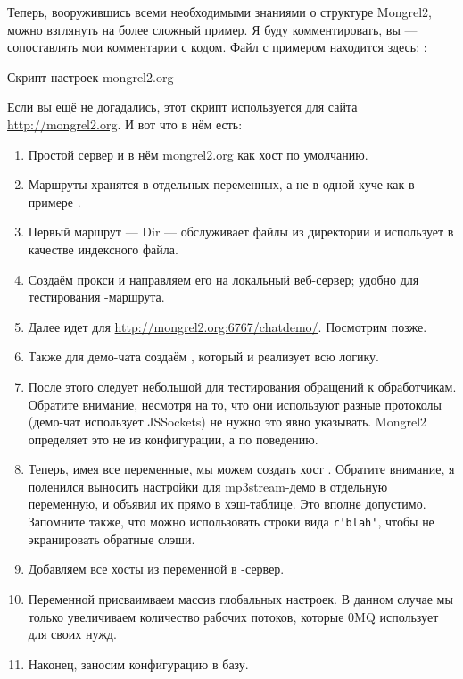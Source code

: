Теперь, вооружившись всеми необходимыми знаниями о структуре Mongrel2,
можно взглянуть на более сложный пример. Я буду комментировать, вы ---
сопоставлять мои комментарии с кодом.  Файл с примером находится
здесь: :

\begin{code}{Скрипт настроек mongrel2.org}
  
\end{code}

Если вы ещё не догадались, этот скрипт используется для сайта
\url{http://mongrel2.org}. И вот что в нём есть:

\begin{enumerate}
\item Простой сервер и в нём mongrel2.org как хост по умолчанию.
\item Маршруты хранятся в отдельных переменных, а не в одной куче как
    в примере .
\item Первый маршрут --- Dir --- обслуживает файлы из директории
     и использует  в качестве индексного файла.
\item Создаём прокси и направляем его на локальный веб-сервер; удобно
    для тестирования -маршрута.
\item Далее идет  для \url{http://mongrel2.org:6767/chatdemo/}. Посмотрим позже.
\item Также для демо-чата создаём , который и реализует всю логику.
\item После этого следует небольшой  для тестирования
    обращений к обработчикам. Обратите внимание, несмотря на то, что они
    используют разные протоколы (демо-чат использует JSSockets) не нужно
    это явно указывать. Mongrel2 определяет это не из конфигурации, а по
    поведению.
\item Теперь, имея все переменные, мы можем создать хост
. Обратите внимание, я поленился выносить настройки
    для mp3stream-демо в отдельную переменную, и объявил их прямо в хэш-таблице. Это вполне
    допустимо. Запомните также, что можно использовать строки вида
    \verb|r'blah'|, чтобы не экранировать обратные слэши.
\item Добавляем все хосты из переменной  в -сервер.
\item Переменной  присваимваем массив глобальных
    настроек. В данном случае мы только увеличиваем количество рабочих
    потоков, которые 0MQ использует для своих нужд.
\item Наконец, заносим конфигурацию в базу.
\end{enumerate}

